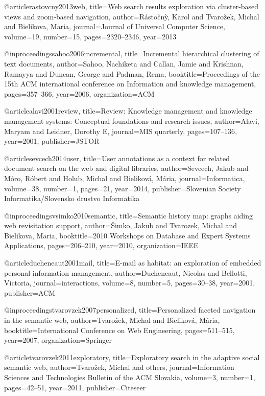 @article{rastovcny2013web,
  title={Web search results exploration via cluster-based views and zoom-based navigation},
  author={R{\'a}sto{\v{c}}n{\`y}, Karol and Tvaro{\v{z}}ek, Michal and Bielikova, Maria},
  journal={Journal of Universal Computer Science},
  volume={19},
  number={15},
  pages={2320--2346},
  year={2013}
}

@inproceedings{sahoo2006incremental,
  title={Incremental hierarchical clustering of text documents},
  author={Sahoo, Nachiketa and Callan, Jamie and Krishnan, Ramayya and Duncan, George and Padman, Rema},
  booktitle={Proceedings of the 15th ACM international conference on Information and knowledge management},
  pages={357--366},
  year={2006},
  organization={ACM}
}

@article{alavi2001review,
  title={Review: Knowledge management and knowledge management systems: Conceptual foundations and research issues},
  author={Alavi, Maryam and Leidner, Dorothy E},
  journal={MIS quarterly},
  pages={107--136},
  year={2001},
  publisher={JSTOR}
}

@article{sevcech2014user,
  title={User annotations as a context for related document search on the web and digital libraries},
  author={Sevcech, Jakub and M{\'o}ro, R{\'o}bert and Holub, Michal and Bielikov{\'a}, M{\'a}ria},
  journal={Informatica},
  volume={38},
  number={1},
  pages={21},
  year={2014},
  publisher={Slovenian Society Informatika/Slovensko drustvo Informatika}
}

@inproceedings{vsimko2010semantic,
  title={Semantic history map: graphs aiding web revisitation support},
  author={{\v{S}}imko, Jakub and Tvarozek, Michal and Bielikova, Maria},
  booktitle={2010 Workshops on Database and Expert Systems Applications},
  pages={206--210},
  year={2010},
  organization={IEEE}
}

@article{ducheneaut2001mail,
  title={E-mail as habitat: an exploration of embedded personal information management},
  author={Ducheneaut, Nicolas and Bellotti, Victoria},
  journal={interactions},
  volume={8},
  number={5},
  pages={30--38},
  year={2001},
  publisher={ACM}
}

@inproceedings{tvarovzek2007personalized,
  title={Personalized faceted navigation in the semantic web},
  author={Tvaro{\v{z}}ek, Michal and Bielikov{\'a}, M{\'a}ria},
  booktitle={International Conference on Web Engineering},
  pages={511--515},
  year={2007},
  organization={Springer}
}

@article{tvarovzek2011exploratory,
  title={Exploratory search in the adaptive social semantic web},
  author={Tvaro{\v{z}}ek, Michal and others},
  journal={Information Sciences and Technologies Bulletin of the ACM Slovakia},
  volume={3},
  number={1},
  pages={42--51},
  year={2011},
  publisher={Citeseer}
}

